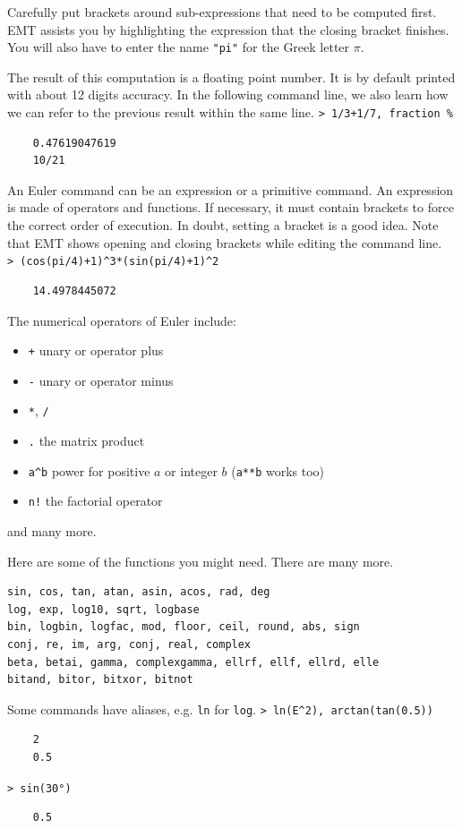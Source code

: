 \documentclass[11pt, a4paper]{article}
\newcommand{\emtcmd}[1]{\noindent\texttt{\textcolor{emtcommand}{>}\ #1}\par\smallskip}
\begin{document}
Carefully put brackets around sub-expressions that need to be computed first. EMT assists you by highlighting the expression that the closing bracket finishes. You will also have to enter the name \texttt{"pi"} for the Greek letter $\pi$.

The result of this computation is a floating point number. It is by default printed with about 12 digits accuracy. In the following command line, we also learn how we can refer to the previous result within the same line.
\emtcmd{1/3+1/7, fraction \%}
\begin{verbatim}
    0.47619047619
    10/21
\end{verbatim}

An Euler command can be an expression or a primitive command. An expression is made of operators and functions. If necessary, it must contain brackets to force the correct order of execution. In doubt, setting a bracket is a good idea. Note that EMT shows opening and closing brackets while editing the command line.
\emtcmd{(cos(pi/4)+1)\^{}3*(sin(pi/4)+1)\^{}2}
\begin{verbatim}
    14.4978445072
\end{verbatim}

The numerical operators of Euler include:
\begin{itemize}
    \item \texttt{+} unary or operator plus
    \item \texttt{-} unary or operator minus
    \item \texttt{*}, \texttt{/}
    \item \texttt{.} the matrix product
    \item \texttt{a\^{}b} power for positive $a$ or integer $b$ (\texttt{a**b} works too)
    \item \texttt{n!} the factorial operator
\end{itemize}
and many more.

Here are some of the functions you might need. There are many more.
\begin{verbatim}
sin, cos, tan, atan, asin, acos, rad, deg
log, exp, log10, sqrt, logbase
bin, logbin, logfac, mod, floor, ceil, round, abs, sign
conj, re, im, arg, conj, real, complex
beta, betai, gamma, complexgamma, ellrf, ellf, ellrd, elle
bitand, bitor, bitxor, bitnot
\end{verbatim}

Some commands have aliases, e.g. \texttt{ln} for \texttt{log}.
\emtcmd{ln(E\^{}2), arctan(tan(0.5))}
\begin{verbatim}
    2
    0.5
\end{verbatim}
\emtcmd{sin(30°)}
\begin{verbatim}
    0.5
\end{verbatim}
\end{document}
